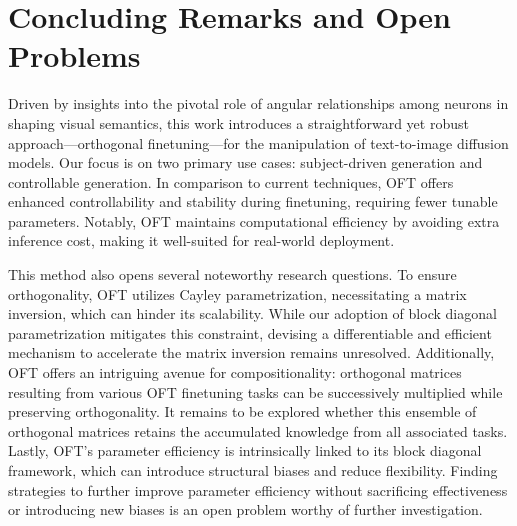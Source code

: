 \section{Concluding Remarks and Open Problems}

Driven by insights into the pivotal role of angular relationships among neurons in shaping visual semantics, this work introduces a straightforward yet robust approach—orthogonal finetuning—for the manipulation of text-to-image diffusion models. Our focus is on two primary use cases: subject-driven generation and controllable generation. In comparison to current techniques, OFT offers enhanced controllability and stability during finetuning, requiring fewer tunable parameters. Notably, OFT maintains computational efficiency by avoiding extra inference cost, making it well-suited for real-world deployment.

This method also opens several noteworthy research questions. To ensure orthogonality, OFT utilizes Cayley parametrization, necessitating a matrix inversion, which can hinder its scalability. While our adoption of block diagonal parametrization mitigates this constraint, devising a differentiable and efficient mechanism to accelerate the matrix inversion remains unresolved. Additionally, OFT offers an intriguing avenue for compositionality: orthogonal matrices resulting from various OFT finetuning tasks can be successively multiplied while preserving orthogonality. It remains to be explored whether this ensemble of orthogonal matrices retains the accumulated knowledge from all associated tasks. Lastly, OFT's parameter efficiency is intrinsically linked to its block diagonal framework, which can introduce structural biases and reduce flexibility. Finding strategies to further improve parameter efficiency without sacrificing effectiveness or introducing new biases is an open problem worthy of further investigation.

